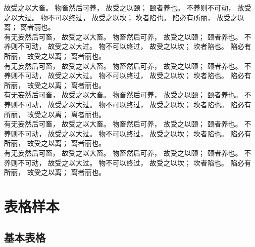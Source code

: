 故受之以大畜。
物畜然后可养，
故受之以颐；
颐者养也。
不养则不可动，
故受之以大过。
物不可以终过，
故受之以坎；
坎者陷也。
陷必有所丽，
故受之以离；
离者丽也。\\
有无妄然后可畜，
故受之以大畜。
物畜然后可养，
故受之以颐；
颐者养也。
不养则不可动，
故受之以大过。
物不可以终过，
故受之以坎；
坎者陷也。
陷必有所丽，
故受之以离；
离者丽也。\\
有无妄然后可畜，
故受之以大畜。
物畜然后可养，
故受之以颐；
颐者养也。
不养则不可动，
故受之以大过。
物不可以终过，
故受之以坎；
坎者陷也。
陷必有所丽，
故受之以离；
离者丽也。\\
有无妄然后可畜，
故受之以大畜。
物畜然后可养，
故受之以颐；
颐者养也。
不养则不可动，
故受之以大过。
物不可以终过，
故受之以坎；
坎者陷也。
陷必有所丽，
故受之以离；
离者丽也。\\
有无妄然后可畜，
故受之以大畜。
物畜然后可养，
故受之以颐；
颐者养也。
不养则不可动，
故受之以大过。
物不可以终过，
故受之以坎；
坎者陷也。
陷必有所丽，
故受之以离；
离者丽也。\\
有无妄然后可畜，
故受之以大畜。
物畜然后可养，
故受之以颐；
颐者养也。
不养则不可动，
故受之以大过。
物不可以终过，
故受之以坎；
坎者陷也。
陷必有所丽，
故受之以离；
离者丽也。\\

\section{表格样本}
\label{chap1:sample:table} 

\subsection{基本表格}
\label{sec:basictable}

